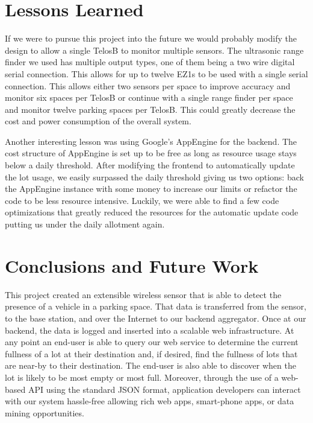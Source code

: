 \documentclass{acm_proc}
\begin{document}
\section{Lessons Learned}\label{sec:lessons}

If we were to pursue this project into the future we would probably modify
the design to allow a single TelosB to monitor multiple sensors.  The
ultrasonic range finder we used has multiple output types, one of them
being a two wire digital serial connection.
This allows for up to twelve EZ1s to be used with a single serial
connection.
This allows either two sensors per space to improve accuracy and monitor
six spaces per TelosB or continue with a single range finder per space and
monitor twelve parking spaces per TelosB.
This could greatly decrease the cost and power consumption of the overall
system.

Another interesting lesson was using Google's AppEngine for the backend.
The cost structure of AppEngine is set up to be free as long as resource
usage stays below a daily threshold.
After modifying the frontend to automatically update the lot usage, we
easily surpassed the daily threshold giving us two options: back the
AppEngine instance with some money to increase our limits or refactor the
code to be less resource intensive.
Luckily, we were able to find a few code optimizations that greatly reduced
the resources for the automatic update code putting us under the daily
allotment again.

\section{Conclusions and Future Work}\label{sec:conclusions}

This project created an extensible wireless sensor that is able to detect
the presence of a vehicle in a parking space.
That data is transferred from the sensor, to the base station, and over the
Internet to our backend aggregator.
Once at our backend, the data is logged and inserted into a scalable web
infrastructure.
At any point an end-user is able to query our web service to determine the
current fullness of a lot at their destination and, if desired, find the
fullness of lots that are near-by to their destination.
The end-user is also able to discover when the lot is likely to be most
empty or most full.
Moreover, through the use of a web-based API using the standard JSON
format, application developers can interact with our system hassle-free
allowing rich web apps, smart-phone apps, or data mining opportunities.
\end{document}

